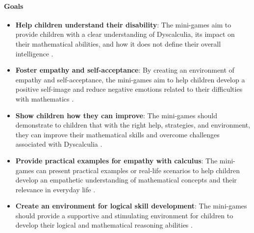 \paragraph{Goals}
\begin{itemize}
    \item \textbf{Help children understand their disability}: The mini-games aim to provide children with a clear understanding of Dyscalculia, its impact on their mathematical abilities, and how it does not define their overall intelligence \cite{understood2024}.
    \item \textbf{Foster empathy and self-acceptance}: By creating an environment of empathy and self-acceptance, the mini-games aim to help children develop a positive self-image and reduce negative emotions related to their difficulties with mathematics \cite{understood2024}.
    \item \textbf{Show children how they can improve}: The mini-games should demonstrate to children that with the right help, strategies, and environment, they can improve their mathematical skills and overcome challenges associated with Dyscalculia \cite{clevelandclinic2024}.
    \item \textbf{Provide practical examples for empathy with calculus}: The mini-games can present practical examples or real-life scenarios to help children develop an empathetic understanding of mathematical concepts and their relevance in everyday life \cite{pmc2024}.
    \item \textbf{Create an environment for logical skill development}: The mini-games should provide a supportive and stimulating environment for children to develop their logical and mathematical reasoning abilities \cite{pressbooks2024}.
\end{itemize}

